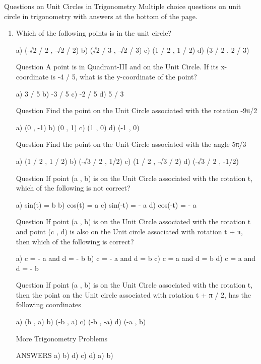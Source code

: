 \documentclass[]{report}
\begin{document}
Questions on Unit Circles in Trigonometry 
Multiple choice questions on unit circle in trigonometry with answers at the bottom of the page. 
\begin{enumerate}
\item Which of the following points is in the unit circle? 

a) (-√2 / 2 , -√2 / 2) 
b) (√2 / 3 , -√2 / 3) 
c) (1 / 2 , 1 / 2) 
d) (3 / 2 , 2 / 3) 


Question A point is in Quadrant-III and on the Unit Circle. If its x-coordinate is -4 / 5, what is the y-coordinate of the point? 

a) 3 / 5 
b) -3 / 5 
c) -2 / 5 
d) 5 / 3 

Question Find the point on the Unit Circle associated with the rotation -9π/2 

a) (0 , -1) 
b) (0 , 1) 
c) (1 , 0) 
d) (-1 , 0) 


Question Find the point on the Unit Circle associated with the angle 5π/3 

a) (1 / 2 , 1 / 2) 
b) (-√3 / 2 , 1/2) 
c) (1 / 2 , -√3 / 2) 
d) (-√3 / 2 , -1/2) 

Question If point (a , b) is on the Unit Circle associated with the rotation t, which of the following is not correct? 

a) sin(t) = b 
b) cos(t) = a 
c) sin(-t) = - a 
d) cos(-t) = - a 

Question If point (a , b) is on the Unit Circle associated with the rotation t and point (c , d) is also on the Unit circle associated with rotation t + π, then which of the following is correct? 

a) c = - a and d = - b 
b) c = - a and d = b 
c) c = a and d = b 
d) c = a and d = - b 
 

Question If point (a , b) is on the Unit Circle associated with the rotation t, then the point on the Unit circle associated with rotation t + π / 2, has the following coordinates 

a) (b , a) 
b) (-b , a) 
c) (-b , -a) 
d) (-a , b) 


More 
Trigonometry Problems 

ANSWERS 
a) 
b) 
d) 
c) 
d) 
a) 
b) 



\end{enumerate}
\end{document}

